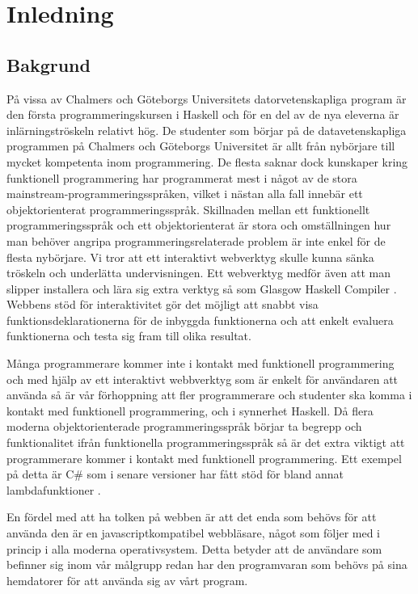 ﻿\section{Inledning}

\subsection{Bakgrund}
På vissa av Chalmers och Göteborgs Universitets datorvetenskapliga program är den första programmeringskursen i Haskell \citep{haskell98} och för en del av de nya eleverna är inlärningströskeln relativt hög. De studenter som börjar på de datavetenskapliga programmen på Chalmers och Göteborgs Universitet är allt från nybörjare till mycket kompetenta inom programmering. De flesta saknar dock kunskaper kring funktionell programmering har programmerat mest i något av de stora mainstream-programmeringsspråken, vilket i nästan alla fall innebär ett objektorienterat programmeringsspråk. Skillnaden mellan ett funktionellt programmeringsspråk och ett objektorienterat är stora och omställningen hur man behöver angripa programmeringsrelaterade problem är inte enkel för de flesta nybörjare. Vi tror att ett interaktivt webverktyg skulle kunna sänka tröskeln och underlätta undervisningen. Ett webverktyg medför även att man slipper installera och lära sig extra verktyg så som Glasgow Haskell Compiler \citep{ghc}. Webbens stöd för interaktivitet gör det möjligt att snabbt visa funktionsdeklarationerna för de inbyggda funktionerna och att enkelt evaluera funktionerna och testa sig fram till olika resultat.

Många programmerare kommer inte i kontakt med funktionell programmering  och med hjälp av ett interaktivt webbverktyg som är enkelt för användaren att använda så är vår förhoppning att fler programmerare och studenter ska komma i kontakt med funktionell programmering, och i synnerhet Haskell. Då flera moderna objektorienterade programmeringsspråk börjar ta begrepp och funktionalitet ifrån funktionella programmeringsspråk så är det extra viktigt att programmerare kommer i kontakt med funktionell programmering. Ett exempel på detta är C\# som i senare versioner har fått stöd för bland annat lambdafunktioner \citep{csharp}. 

En fördel med att ha tolken på webben är att det enda som behövs för att använda den är en javascriptkompatibel webbläsare, något som följer med i princip i alla moderna operativsystem. Detta betyder att de användare som befinner sig inom vår målgrupp redan har den programvaran som behövs på sina hemdatorer för att använda sig av vårt program.

